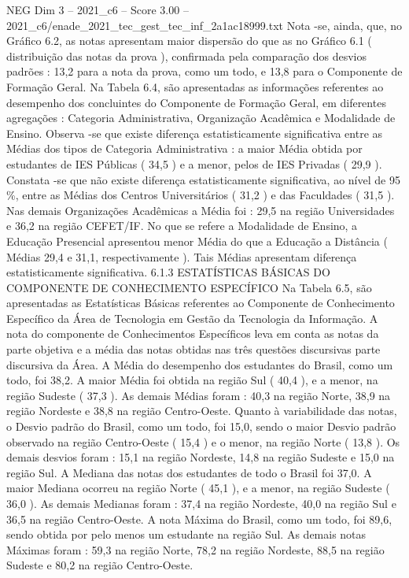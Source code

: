 \begin{textsample}{NEG Dim 3 – 2021\_c6 – Score 3.00 – 2021\_c6/enade\_2021\_tec\_gest\_tec\_inf\_2a1ac18999.txt}
Nota -se, ainda, que, no Gráfico 6.2, as notas apresentam maior dispersão do que as no Gráfico 6.1 ( distribuição das notas da prova ), confirmada pela comparação dos desvios padrões : 13,2 para a nota da prova, como um todo, e 13,8 para o Componente de Formação Geral.
Na Tabela 6.4, são apresentadas as informações referentes ao desempenho dos concluintes do Componente de Formação Geral, em diferentes agregações : Categoria Administrativa, Organização Acadêmica e Modalidade de Ensino.
Observa -se que existe diferença estatisticamente significativa entre as Médias dos tipos de Categoria Administrativa : a maior Média obtida por estudantes de IES Públicas ( 34,5 ) e a menor, pelos de IES Privadas ( 29,9 ).
Constata -se que não existe diferença estatisticamente significativa, ao nível de 95 \%, entre as Médias dos Centros Universitários ( 31,2 ) e das Faculdades ( 31,5 ).
Nas demais Organizações Acadêmicas a Média foi : 29,5 na região Universidades e 36,2 na região CEFET/IF.
No que se refere a Modalidade de Ensino, a Educação Presencial apresentou menor Média do que a Educação a Distância ( Médias 29,4 e 31,1, respectivamente ).
Tais Médias apresentam diferença estatisticamente significativa. 6.1.3 ESTATÍSTICAS BÁSICAS DO COMPONENTE DE CONHECIMENTO ESPECÍFICO Na Tabela 6.5, são apresentadas as Estatísticas Básicas referentes ao Componente de Conhecimento Específico da Área de Tecnologia em Gestão da Tecnologia da Informação.
A nota do componente de Conhecimentos Específicos leva em conta as notas da parte objetiva e a média das notas obtidas nas três questões discursivas parte discursiva da Área.
A Média do desempenho dos estudantes do Brasil, como um todo, foi 38,2.
A maior Média foi obtida na região Sul ( 40,4 ), e a menor, na região Sudeste ( 37,3 ).
As demais Médias foram : 40,3 na região Norte, 38,9 na região Nordeste e 38,8 na região Centro-Oeste.
Quanto à variabilidade das notas, o Desvio padrão do Brasil, como um todo, foi 15,0, sendo o maior Desvio padrão observado na região Centro-Oeste ( 15,4 ) e o menor, na região Norte ( 13,8 ).
Os demais desvios foram : 15,1 na região Nordeste, 14,8 na região Sudeste e 15,0 na região Sul.
A Mediana das notas dos estudantes de todo o Brasil foi 37,0.
A maior Mediana ocorreu na região Norte ( 45,1 ), e a menor, na região Sudeste ( 36,0 ).
As demais Medianas foram : 37,4 na região Nordeste, 40,0 na região Sul e 36,5 na região Centro-Oeste.
A nota Máxima do Brasil, como um todo, foi 89,6, sendo obtida por pelo menos um estudante na região Sul.
As demais notas Máximas foram : 59,3 na região Norte, 78,2 na região Nordeste, 88,5 na região Sudeste e 80,2 na região Centro-Oeste.

\end{textsample}
